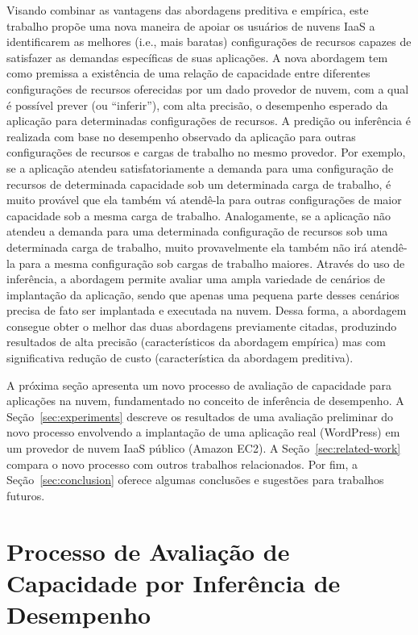 \documentclass[12pt]{article}
\begin{document}
Visando combinar as vantagens das abordagens preditiva e empírica, este trabalho propõe uma nova maneira de apoiar os usuários de nuvens IaaS a identificarem as melhores (i.e., mais baratas) configurações de recursos capazes de satisfazer as demandas específicas de suas aplicações. A nova abordagem tem como premissa a existência de uma relação de capacidade entre diferentes configurações de recursos oferecidas por um dado provedor de nuvem, com a qual é possível prever (ou ``inferir''), com alta precisão, o desempenho esperado da aplicação para determinadas configurações de recursos. A predição ou inferência é realizada com base no desempenho observado da aplicação para outras configurações de recursos e cargas de trabalho no mesmo provedor. Por exemplo, se a aplicação atendeu satisfatoriamente a demanda para uma configuração de recursos de determinada capacidade sob um determinada carga de trabalho, é muito provável que ela também vá atendê-la para outras configurações de maior capacidade sob a mesma carga de trabalho. Analogamente, se a aplicação não atendeu a demanda para uma determinada configuração de recursos sob uma determinada carga de trabalho, muito provavelmente ela também não irá atendê-la para a mesma configuração sob cargas de trabalho maiores. Através do uso de inferência, a abordagem permite avaliar uma ampla variedade de cenários de implantação da aplicação, sendo que apenas uma pequena parte desses cenários precisa de fato ser implantada e executada na nuvem. Dessa forma, a abordagem consegue obter o melhor das duas abordagens previamente citadas, produzindo resultados de alta precisão (característicos da abordagem empírica) mas com significativa redução de custo (característica da abordagem preditiva).

A próxima seção apresenta um novo processo de avaliação de capacidade para aplicações na nuvem, fundamentado no conceito de inferência de desempenho. A Seção~\ref{sec:experiments} descreve os resultados de uma avaliação preliminar do novo processo envolvendo a implantação de uma aplicação real (WordPress) em um provedor de nuvem IaaS público (Amazon EC2). A Seção~\ref{sec:related-work} compara o novo processo com outros trabalhos relacionados. Por fim, a Seção~\ref{sec:conclusion} oferece algumas conclusões e sugestões para trabalhos futuros.


\section{Processo de Avaliação de Capacidade por Inferência de Desempenho}\label{sec:process}
\end{document}
